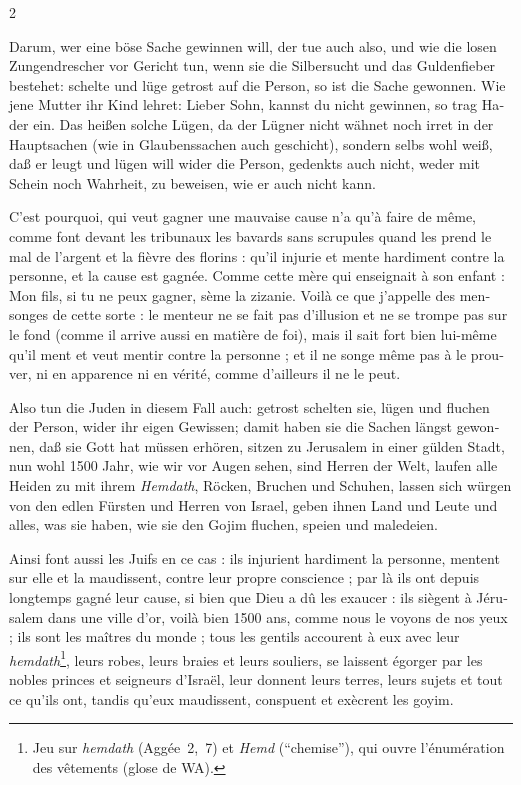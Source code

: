 \documentclass[a4paper,12pt]{article}
\newcommand\chunks[2]{%
\begin{leftcolumn*}\begin{otherlanguage}{german}%
{#1}%
\end{otherlanguage}\end{leftcolumn*}%
\begin{rightcolumn}\begin{otherlanguage}{french}%
{#2}%
\end{otherlanguage}\end{rightcolumn}%
}
\begin{document}
\begin{paracol}{2}
  \chunks{Darum, wer eine böse Sache gewinnen will, der tue auch also, und wie die losen Zungendrescher vor Gericht tun, wenn sie die Silbersucht und das Guldenfieber bestehet: schelte und lüge getrost auf die Person, so ist die Sache gewonnen. Wie jene Mutter ihr Kind lehret: Lieber Sohn, kannst du nicht gewinnen, so trag Hader ein. Das heißen solche Lügen, da der Lügner nicht wähnet noch irret in der Hauptsachen (wie in Glaubenssachen auch geschicht), sondern selbs wohl weiß, daß er leugt und lügen will wider die Person, gedenkts auch nicht, weder mit Schein noch Wahrheit, zu beweisen, wie er auch nicht kann.}
         {C’est pourquoi, qui veut gagner une mauvaise cause n’a qu’à faire de même, comme font devant les tribunaux les bavards sans scrupules quand les prend le mal de l’argent et la fièvre des florins : qu’il injurie et mente hardiment contre la personne, et la cause est gagnée. Comme cette mère qui enseignait à son enfant : Mon fils, si tu ne peux gagner, sème la zizanie. Voilà ce que j’appelle des mensonges de cette sorte : le menteur ne se fait pas d’illusion et ne se trompe pas sur le fond (comme il arrive aussi en matière de foi), mais il sait fort bien lui-même qu’il ment et veut mentir contre la personne ; et il ne songe même pas à le prouver, ni en apparence ni en vérité, comme d’ailleurs il ne le peut.}
  \chunks{Also tun die Juden in diesem Fall auch: getrost schelten sie, lügen und fluchen der Person, wider ihr eigen Gewissen; damit haben sie die Sachen längst gewonnen, daß sie Gott hat müssen erhören, sitzen zu Jerusalem in einer gülden Stadt, nun wohl 1500 Jahr, wie wir vor Augen sehen, sind Herren der Welt, laufen alle Heiden zu mit ihrem \emph{Hemdath}, Röcken, Bruchen und Schuhen, lassen sich würgen von den edlen Fürsten und Herren von Israel, geben ihnen Land und Leute und alles, was sie haben, wie sie den Gojim fluchen, speien und maledeien.}
         {Ainsi font aussi les Juifs en ce cas : ils injurient hardiment la personne, mentent sur elle et la maudissent, contre leur propre conscience ; par là ils ont depuis longtemps gagné leur cause, si bien que Dieu a dû les exaucer : ils siègent à Jérusalem dans une ville d’or, voilà bien 1500 ans, comme nous le voyons de nos yeux ; ils sont les maîtres du monde ; tous les gentils accourent à eux avec leur \emph{hemdath}\footnote{Jeu sur \emph{hemdath} (Aggée~2,~7) et \foreignlanguage{german}{\emph{Hemd}} (\enquote{chemise}), qui ouvre l’énumération des vêtements (glose de WA).}, leurs robes, leurs braies et leurs souliers, se laissent égorger par les nobles princes et seigneurs d’Israël, leur donnent leurs terres, leurs sujets et tout ce qu’ils ont, tandis qu’eux maudissent, conspuent et exècrent les goyim.}

\end{paracol}
\end{document}

